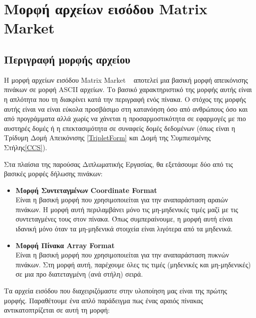 ﻿%

\chapter{Μορφή αρχείων εισόδου \textlatin{Matrix Market}}
\label{ch:chapterMatrixMarketFormat}

\section {Περιγραφή μορφής αρχείου}
Η μορφή αρχείων εισόδου \textlatin{Matrix Market} ~\cite{boisvert1996matrix} αποτελεί μια βασική μορφή απεικόνισης πινάκων σε μορφή \textlatin{ASCII} αρχείων. Το βασικό χαρακτηριστικό της μορφής αυτής είναι η απλότητα που τη διακρίνει κατά την περιγραφή ενός πίνακα. Ο στόχος της μορφής αυτής είναι να είναι εύκολα προσβάσιμο στη κατανόηση όσο από ανθρώπους όσο και από προγράμματα αλλά χωρίς να χάνεται η προσαρμοστικότητα σε εφαρμογές με πιο αυστηρές δομές ή η επεκτασιμότητα σε συναφείς δομές δεδομένων (όπως είναι η Τρίδυμη Δομή Απεικόνισης \ref{TripletForm} και Δομή της Συμπιεσμένης Στήλης\ref{CCS}).

Στα πλαίσια της παρούσας Διπλωματικής Εργασίας, θα εξετάσουμε δύο από τις βασικές μορφές δήλωσης πινάκων:

\begin{itemize}
    \item \textbf{Μορφή Συντεταγμένων \textlatin{Coordinate Format}} \\
    Είναι η βασική μορφή που χρησιμοποιείται για την αναπαράσταση αραιών πινάκων. Η μορφή αυτή περιλαμβάνει μόνο τις μη-μηδενικές τιμές μαζί με τις συντεταγμένες τους στον πίνακα. Όπως συμπεραίνουμε, η μορφή αυτή είναι ιδανική μόνο όταν τα μη-μηδενικά στοιχεία είναι λιγότερα από τα μηδενικά.
    \item \textbf{Μορφή Πίνακα \textlatin{Array Format}} \\
    Είναι η βασική μορφή που χρησιμοποιείται για την αναπαράσταση πυκνών πινάκων. Στη μορφή αυτή, παρέχουμε όλες τις τιμές (μηδενικές και μη-μηδενικές) σε μια προ διατεταγμένη (ανά στήλη) σειρά.
\end{itemize}

Τα αρχεία εισόδου που διαχειριζόμαστε στην υλοποίηση μας είναι της πρώτης μορφής. Παραθέτουμε ένα απλό παράδειγμα πως ένας αραιός πίνακας αντικατοπτρίζεται σε αυτή τη μορφή:


